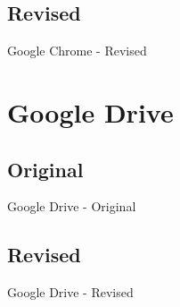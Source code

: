 \documentclass{beamer}
\begin{document}
\subsection{Revised}
\begin{frame}{Google Chrome - Revised}
\end{frame}


\section{Google Drive}

\subsection{Original}
\begin{frame}{Google Drive - Original}
\end{frame}

\subsection{Revised}
\begin{frame}{Google Drive - Revised}
\end{frame}
\end{document}
